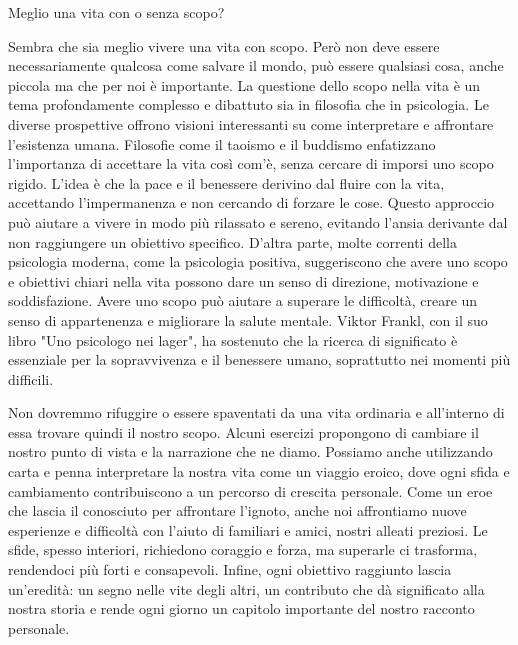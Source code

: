 \documentclass[12pt]{book} %
\begin{document}
\begin{mdframed}[linewidth=1pt]
Meglio una vita con o senza scopo?

Sembra che sia meglio vivere una vita con scopo. Però non deve essere necessariamente qualcosa come salvare il mondo, può essere qualsiasi cosa, anche piccola ma che per noi è importante. La questione dello scopo nella vita è un tema profondamente complesso e dibattuto sia in filosofia che in psicologia. Le diverse prospettive offrono visioni interessanti su come interpretare e affrontare l'esistenza umana. 
Filosofie come il taoismo e il buddismo enfatizzano l'importanza di accettare la vita così com'è, senza cercare di imporsi uno scopo rigido. L'idea è che la pace e il benessere derivino dal fluire con la vita, accettando l'impermanenza e non cercando di forzare le cose. Questo approccio può aiutare a vivere in modo più rilassato e sereno, evitando l'ansia derivante dal non raggiungere un obiettivo specifico.
D'altra parte, molte correnti della psicologia moderna, come la psicologia positiva, suggeriscono che avere uno scopo e obiettivi chiari nella vita possono dare un senso di direzione, motivazione e soddisfazione. Avere uno scopo può aiutare a superare le difficoltà, creare un senso di appartenenza e migliorare la salute mentale. Viktor Frankl, con il suo libro "Uno psicologo nei lager", ha sostenuto che la ricerca di significato è essenziale per la sopravvivenza e il benessere umano, soprattutto nei momenti più difficili.

Non dovremmo rifuggire o essere spaventati da una vita ordinaria e all'interno di essa trovare quindi il nostro scopo. Alcuni esercizi propongono di cambiare il nostro punto di vista e la narrazione che ne diamo. Possiamo anche utilizzando carta e penna interpretare la nostra vita come un viaggio eroico, dove ogni sfida e cambiamento contribuiscono a un percorso di crescita personale. Come un eroe che lascia il conosciuto per affrontare l’ignoto, anche noi affrontiamo nuove esperienze e difficoltà con l’aiuto di familiari e amici, nostri alleati preziosi. Le sfide, spesso interiori, richiedono coraggio e forza, ma superarle ci trasforma, rendendoci più forti e consapevoli. Infine, ogni obiettivo raggiunto lascia un’eredità: un segno nelle vite degli altri, un contributo che dà significato alla nostra storia e rende ogni giorno un capitolo importante del nostro racconto personale.


\end{mdframed}
\end{document}
